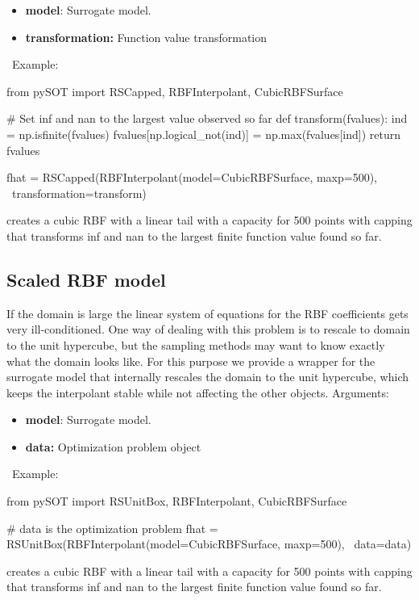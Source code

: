 \documentclass[]{article}
\begin{document}
\begin{itemize}
	\item \textbf{model}: Surrogate model.
	\item \textbf{transformation:} Function value transformation
\end{itemize}

\ \newline Example: 

\begin{python}
from pySOT import RSCapped, RBFInterpolant, CubicRBFSurface

# Set inf and nan to the largest value observed so far	          
def transform(fvalues):
	ind = np.isfinite(fvalues)
	fvalues[np.logical_not(ind)] = np.max(fvalues[ind])
	return fvalues
	
fhat = RSCapped(RBFInterpolant(model=CubicRBFSurface, maxp=500), \ 
		transformation=transform)
\end{python}

creates a cubic RBF with a linear tail with a capacity for 500 points with capping that 
transforms inf and nan to the largest finite function value found so far.

\subsection{Scaled RBF model} If the domain is large the linear system of equations 
for the RBF coefficients gets very ill-conditioned. One way of dealing with this problem 
is to rescale to domain to the unit hypercube, but the sampling methods may want to 
know exactly what the domain looks like. For this purpose we provide a wrapper for 
the surrogate model that internally rescales the domain to the unit hypercube, which 
keeps the interpolant stable while not affecting the other objects.  Arguments: \\

\begin{itemize}
	\item \textbf{model}: Surrogate model.
	\item \textbf{data:} Optimization problem object
\end{itemize}

\ \newline Example: 

\begin{python}
from pySOT import RSUnitBox, RBFInterpolant, CubicRBFSurface

# data is the optimization problem
fhat = RSUnitBox(RBFInterpolant(model=CubicRBFSurface, maxp=500), \ 
		data=data)
\end{python}
creates a cubic RBF with a linear tail with a capacity for 500 points with capping that 
transforms inf and nan to the largest finite function value found so far.
\end{document}

